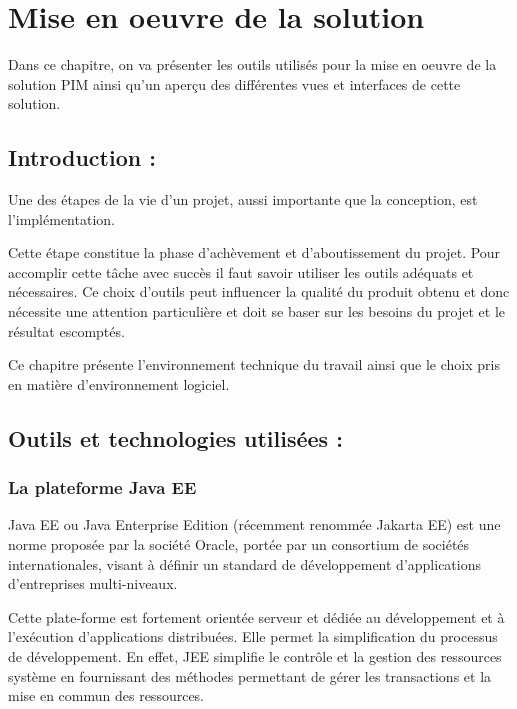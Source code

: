 \chapter{Mise en oeuvre de la solution}

\label{sec:realisation}

\begin{fquote}
Dans ce chapitre, on va présenter les outils utilisés pour la mise en oeuvre de la solution PIM ainsi qu’un aperçu des différentes vues et interfaces de cette solution.
\end{fquote}

\clearpage

\section{Introduction :}

Une des étapes de la vie d’un projet, aussi importante que la conception, est l’implémentation.

\medskip

Cette étape constitue la phase d’achèvement et d’aboutissement du projet. Pour accomplir cette tâche avec succès il faut savoir utiliser les outils adéquats et nécessaires. Ce choix d’outils peut influencer la qualité du produit obtenu et donc nécessite une attention particulière et doit se baser sur les besoins du projet et le résultat escomptés.

\medskip

Ce chapitre présente l’environnement technique du travail ainsi que le choix pris en matière d’environnement logiciel. 

\section{Outils et technologies utilisées :}
\subsection{La plateforme Java EE}

Java EE ou Java Enterprise Edition (récemment renommée Jakarta EE) est une norme proposée par la société Oracle, portée par un consortium de sociétés internationales, visant à définir un standard de développement d’applications d’entreprises multi-niveaux\cite{wiki:java}.

\medskip

Cette plate-forme est fortement orientée serveur et dédiée au développement et à l’exécution d’applications distribuées. Elle permet la simplification du processus de développement. En effet, JEE simplifie le contrôle et la gestion des ressources système en fournissant des méthodes permettant de gérer les transactions et la mise en commun des ressources.


